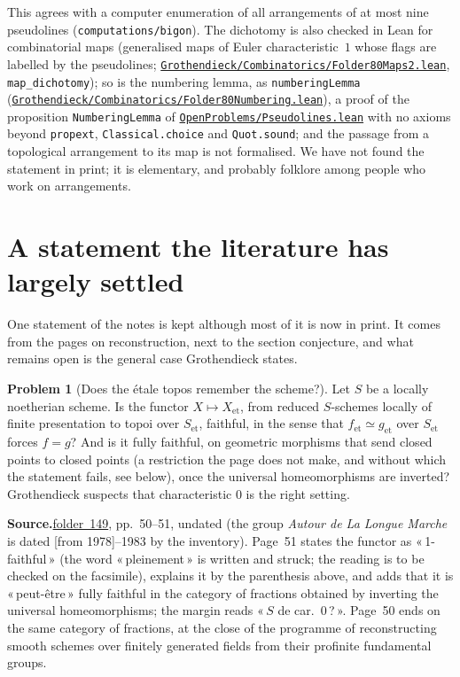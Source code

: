 \documentclass[11pt]{article}
\newcommand{\q}[1]{«\,#1\,»}
\newcommand{\fac}[1]{\href{https://grothendieck.umontpellier.fr/#1.pdf}{folder~#1}}
\theoremstyle{definition}
\newtheorem{problem}{Problem}
\theoremstyle{plain}\newtheorem*{proposition}{Proposition}\theoremstyle{definition}
\newcommand{\entry}[1]{\par\medskip\noindent\textbf{#1}\enspace}
\newcommand{\src}[1]{\entry{Source.}#1}
\newcommand{\leanop}[1]{\href{https://github.com/Commutator-IO/GrothendieckArchivesProofs/blob/main/OpenProblems/#1.lean}{\nolinkurl{OpenProblems/#1.lean}}}
\begin{document}
This agrees with a computer enumeration of all arrangements of at most nine pseudolines (\nolinkurl{computations/bigon}). The dichotomy is also checked in Lean for combinatorial maps (generalised maps of Euler characteristic~$1$ whose flags are labelled by the pseudolines; \href{https://github.com/Commutator-IO/GrothendieckArchivesProofs/blob/main/Grothendieck/Combinatorics/Folder80Maps2.lean}{\nolinkurl{Grothendieck/Combinatorics/Folder80Maps2.lean}}, \texttt{map\_dichotomy}); so is the numbering lemma, as \texttt{numberingLemma} (\href{https://github.com/Commutator-IO/GrothendieckArchivesProofs/blob/main/Grothendieck/Combinatorics/Folder80Numbering.lean}{\nolinkurl{Grothendieck/Combinatorics/Folder80Numbering.lean}}), a proof of the proposition \texttt{NumberingLemma} of \leanop{Pseudolines} with no axioms beyond \texttt{propext}, \texttt{Classical.choice} and \texttt{Quot.sound}; and the passage from a topological arrangement to its map is not formalised. We have not found the statement in print; it is elementary, and probably folklore among people who work on arrangements.

\section{A statement the literature has largely settled}\label{sec:etrec}

One statement of the notes is kept although most of it is now in print. It comes from the pages on reconstruction, next to the section conjecture, and what remains open is the general case Grothendieck states.

\begin{problem}[Does the étale topos remember the scheme?]\label{p:etrec}
Let $S$ be a locally noetherian scheme. Is the functor $X \mapsto X_{\mathrm{et}}$, from reduced $S$-schemes locally of finite presentation to topoi over $S_{\mathrm{et}}$, faithful, in the sense that $f_{\mathrm{et}} \simeq g_{\mathrm{et}}$ over $S_{\mathrm{et}}$ forces $f = g$? And is it fully faithful, on geometric morphisms that send closed points to closed points (a restriction the page does not make, and without which the statement fails, see below), once the universal homeomorphisms are inverted? Grothendieck suspects that characteristic $0$ is the right setting.
\end{problem}

\src{\fac{149}, pp.~50--51, undated (the group \emph{Autour de La Longue Marche} is dated [from 1978]--1983 by the inventory). Page~51 states the functor as \q{1-faithful} (the word \q{pleinement} is written and struck; the reading is to be checked on the facsimile), explains it by the parenthesis above, and adds that it is \q{peut-être} fully faithful in the category of fractions obtained by inverting the universal homeomorphisms; the margin reads \q{$S$ de car.~0\,?}. Page~50 ends on the same category of fractions, at the close of the programme of reconstructing smooth schemes over finitely generated fields from their profinite fundamental groups.}
\end{document}
